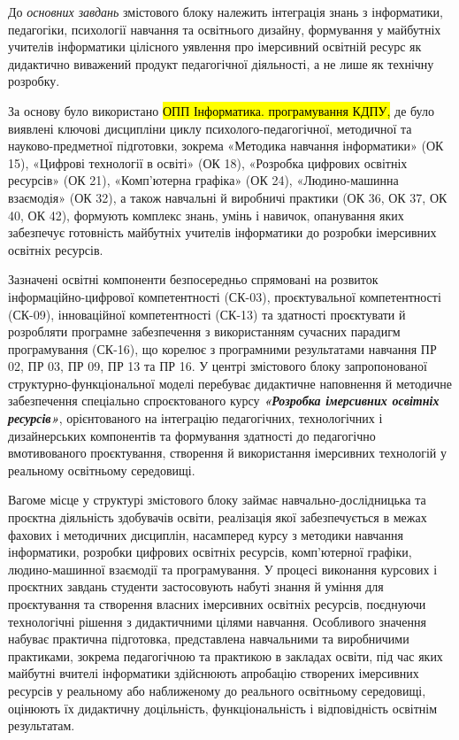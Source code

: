 До \emph{основних завдань} змістового блоку належить інтеграція знань з інформатики, педагогіки, психології навчання та освітнього дизайну, формування у майбутніх учителів інформатики цілісного уявлення про імерсивний освітній ресурс як дидактично виважений продукт педагогічної діяльності, а не лише як технічну розробку.

За основу було використано \hl{ОПП Інформатика. програмування КДПУ,} де було виявлені ключові дисципліни циклу психолого-педагогічної, методичної та науково-предметної підготовки, зокрема «Методика навчання інформатики» (ОК 15), «Цифрові технології в освіті» (ОК 18), «Розробка цифрових освітніх ресурсів» (ОК 21), «Комп'ютерна графіка» (ОК 24), «Людино-машинна взаємодія» (ОК 32), а також навчальні й виробничі практики (ОК 36, ОК 37, ОК 40, ОК 42), формують комплекс знань, умінь і навичок, опанування яких забезпечує готовність майбутніх учителів інформатики до розробки імерсивних освітніх ресурсів.

Зазначені освітні компоненти безпосередньо спрямовані на розвиток інформаційно-цифрової компетентності (СК-03), проєктувальної компетентності (СК-09), інноваційної компетентності (СК-13) та здатності проєктувати й розробляти програмне забезпечення з використанням сучасних парадигм програмування (СК-16), що корелює з програмними результатами навчання ПР 02, ПР 03, ПР 09, ПР 13 та ПР 16. У центрі змістового блоку запропонованої структурно-функціональної моделі перебуває дидактичне наповнення й методичне забезпечення спеціально спроєктованого курсу \emph{\textbf{«Розробка імерсивних освітніх ресурсів»}}, орієнтованого на інтеграцію педагогічних, технологічних і дизайнерських компонентів та формування здатності до педагогічно вмотивованого проєктування, створення й використання імерсивних технологій у реальному освітньому середовищі.

Вагоме місце у структурі змістового блоку займає навчально-дослідницька та проєктна діяльність здобувачів освіти, реалізація якої забезпечується в межах фахових і методичних дисциплін, насамперед курсу з методики навчання інформатики, розробки цифрових освітніх ресурсів, комп'ютерної графіки, людино-машинної взаємодії та програмування. У процесі виконання курсових і проєктних завдань студенти застосовують набуті знання й уміння для проєктування та створення власних імерсивних освітніх ресурсів, поєднуючи технологічні рішення з дидактичними цілями навчання. Особливого значення набуває практична підготовка, представлена навчальними та виробничими практиками, зокрема педагогічною та практикою в закладах освіти, під час яких майбутні вчителі інформатики здійснюють апробацію створених імерсивних ресурсів у реальному або наближеному до реального освітньому середовищі, оцінюють їх дидактичну доцільність, функціональність і відповідність освітнім результатам.

